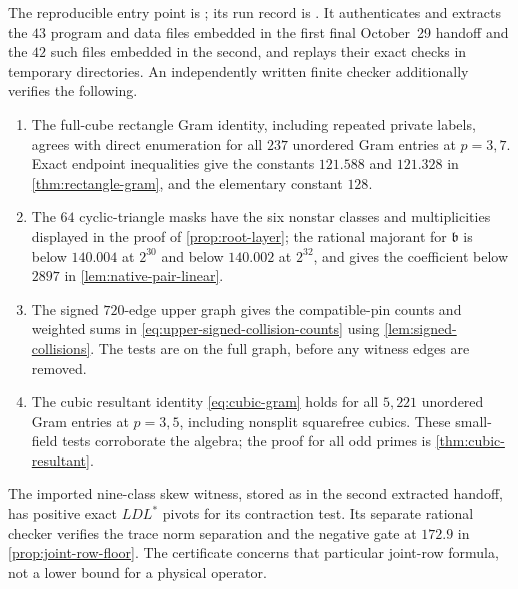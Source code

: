 \begin{certificate}
\label{cert:astra-local}
The reproducible entry point is
; its run record is
.
It authenticates and extracts the $43$ program and data files
embedded in the first final October~29 handoff and the $42$ such
files embedded in the second, and replays
their exact checks in temporary directories. An independently
written finite checker additionally verifies the following.
\begin{enumerate}[label=(\roman*)]
\item The full-cube rectangle Gram identity, including repeated
private labels, agrees with direct enumeration for all $237$
unordered Gram entries at $p=3,7$. Exact endpoint inequalities
give the constants $121.588$ and $121.328$ in
\cref{thm:rectangle-gram}, and the elementary constant $128$.
\item The $64$ cyclic-triangle masks have the six nonstar classes
and multiplicities displayed in the proof of
\cref{prop:root-layer}; the rational majorant for
$\mathfrak b$ is below $140.004$ at $2^{30}$ and below $140.002$
at $2^{32}$, and gives the coefficient below $2897$ in
\cref{lem:native-pair-linear}.
\item The signed $720$-edge upper graph gives the compatible-pin
counts and weighted sums in \eqref{eq:upper-signed-collision-counts}
using \cref{lem:signed-collisions}. The tests are on the full graph,
before any witness edges are removed.
\item The cubic resultant identity \eqref{eq:cubic-gram} holds
for all $5{,}221$ unordered Gram entries at $p=3,5$, including
nonsplit squarefree cubics. These small-field tests corroborate
the algebra; the proof for all odd primes is
\cref{thm:cubic-resultant}.
\end{enumerate}
The imported nine-class skew witness, stored as
 in the second extracted
handoff, has positive exact $LDL^*$ pivots for its contraction
test. Its separate rational checker verifies the trace norm
separation and the negative gate at $172.9$ in
\cref{prop:joint-row-floor}. The certificate concerns that
particular joint-row formula, not a lower bound for a physical
operator.
\end{certificate}


